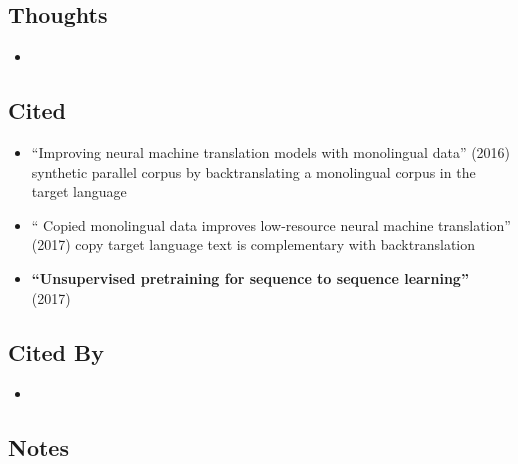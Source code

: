 \documentclass{article}
\begin{document}
\subsection*{Thoughts}
\begin{itemize}
	\item
\end{itemize}

\subsection*{Cited}
\begin{itemize}
	\item ``Improving neural machine translation models with monolingual data'' (2016) synthetic parallel corpus by backtranslating a monolingual corpus in the target language
	\item `` Copied monolingual data improves low-resource neural machine translation'' (2017) copy target language text is complementary with backtranslation
	\item \textbf{``Unsupervised pretraining for sequence to sequence learning''} (2017)
\end{itemize}

\subsection*{Cited By}
\begin{itemize}
	\item
\end{itemize}

\subsection*{Notes}
\end{document}
